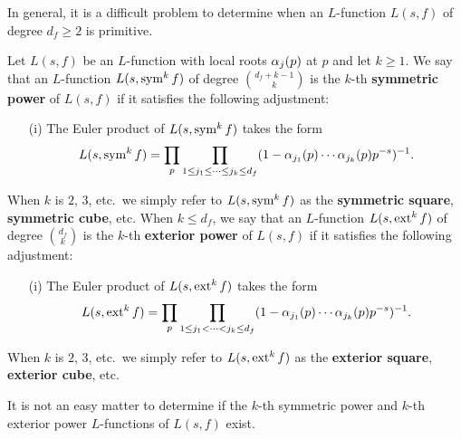     \begin{remark}
      In general, it is a difficult problem to determine when an $L$-function $L(s,f)$ of degree $d_{f} \ge 2$ is primitive.
    \end{remark}

    Let $L(s,f)$ be an $L$-function with local roots $\alpha_{j}(p)$ at $p$ and let $k \ge 1$. We say that an $L$-function $L(s,\operatorname{\mathrm{sym}}^{k}f)$ of degree $\binom{d_{f}+k-1}{k}$ is the $k$-th \textbf{symmetric power} of $L(s,f)$ if it satisfies the following adjustment:
    \begin{itemize}
      \item[(i)] The Euler product of $L(s,\operatorname{\mathrm{sym}}^{k}f)$ takes the form
      \[
        L(s,\operatorname{\mathrm{sym}}^{k}f) = \prod_{p}\prod_{1 \le j_{1} \le \cdots \le j_{k} \le d_{f}}(1-\alpha_{j_{1}}(p) \cdots \alpha_{j_{k}}(p)p^{-s})^{-1}.
      \]
    \end{itemize}
    When $k$ is $2$, $3$, etc.\ we simply refer to $L(s,\operatorname{\mathrm{sym}}^{k}f)$ as the \textbf{symmetric square}, \textbf{symmetric cube}, etc. When $k \le d_{f}$, we say that an $L$-function $L(s,\operatorname{\mathrm{ext}}^{k}f)$ of degree $\binom{d_{f}}{k}$ is the $k$-th \textbf{exterior power} of $L(s,f)$ if it satisfies the following adjustment:
    \begin{itemize}
      \item[(i)] The Euler product of $L(s,\operatorname{\mathrm{ext}}^{k}f)$ takes the form
      \[
        L(s,\operatorname{\mathrm{ext}}^{k}f) = \prod_{p}\prod_{1 \le j_{1} < \cdots < j_{k} \le d_{f}}(1-\alpha_{j_{1}}(p) \cdots \alpha_{j_{k}}(p)p^{-s})^{-1}.
      \]
    \end{itemize}
    When $k$ is $2$, $3$, etc.\ we simply refer to $L(s,\operatorname{\mathrm{ext}}^{k}f)$ as the \textbf{exterior square}, \textbf{exterior cube}, etc.

    \begin{remark}
      It is not an easy matter to determine if the $k$-th symmetric power and $k$-th exterior power $L$-functions of $L(s,f)$ exist.
    \end{remark}


